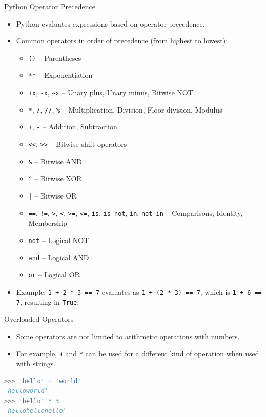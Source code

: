\begin{frame}{Python Operator Precedence}
    \begin{itemize}
        \item Python evaluates expressions based on operator precedence.
        \item Common operators in order of precedence (from highest to lowest):
        \begin{itemize}
            \item \texttt{()} -- Parentheses
            \item \texttt{**} -- Exponentiation
            \item \texttt{+x}, \texttt{-x}, \texttt{\textasciitilde{}x} -- Unary plus, Unary minus, Bitwise NOT
            \item \texttt{*}, \texttt{/}, \texttt{//}, \texttt{\%} -- Multiplication, Division, Floor division, Modulus
            \item \texttt{+}, \texttt{-} -- Addition, Subtraction
            \item \texttt{<<}, \texttt{>>} -- Bitwise shift operators
            \item \texttt{\&} -- Bitwise AND
            \item \texttt{\textasciicircum} -- Bitwise XOR
            \item \texttt{|} -- Bitwise OR
            \item \texttt{==}, \texttt{!=}, \texttt{>}, \texttt{<}, \texttt{>=}, \texttt{<=}, \texttt{is}, \texttt{is not}, \texttt{in}, \texttt{not in} -- Comparisons, Identity, Membership
            \item \texttt{not} -- Logical NOT
            \item \texttt{and} -- Logical AND
            \item \texttt{or} -- Logical OR
        \end{itemize}
        \item Example: \texttt{1 + 2 * 3 == 7} evaluates as \texttt{1 + (2 * 3) == 7}, which is \texttt{1 + 6 == 7}, resulting in \texttt{True}.
    \end{itemize}
\end{frame}
\begin{frame}[fragile]{Overloaded Operators}
    \begin{itemize}
        \item Some operators are not limited to arithmetic operations with numbers.
        \item For example, \texttt{+} and \texttt{*} can be used for a different kind of operation when used with strings.
    \end{itemize}
    \begin{lstlisting}[style=colorful, language=Python]
>>> 'hello' + 'world'
'helloworld'
>>> 'hello' * 3
'hellohellohello'
    \end{lstlisting}
\end{frame}

